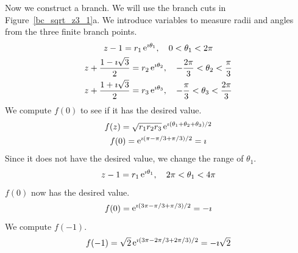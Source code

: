 {\begin{Solution}
  Now we construct a branch.  We will use the branch cuts in
  Figure~\ref{bc_sqrt_z3_1}a.  We introduce variables to measure radii and
  angles from the three finite branch points.
  \begin{gather*}
    z - 1 = r_1 \mathop{\mathrm{e}}\nolimits^{\imath \theta_1}, \quad 0 < \theta_1 < 2 \pi 
    \\
    z + \frac{1 - \imath \sqrt{3}}{2} = r_2 \mathop{\mathrm{e}}\nolimits^{\imath \theta_2}, 
    \quad -\frac{2 \pi}{3} < \theta_2 < \frac{\pi}{3} 
    \\
    z + \frac{1 + \imath \sqrt{3}}{2} = r_3 \mathop{\mathrm{e}}\nolimits^{\imath \theta_3},
    \quad -\frac{\pi}{3} < \theta_3 < \frac{2 \pi}{3}
  \end{gather*}
  We compute $f(0)$ to see if it has the desired value.
  \begin{gather*}
    f(z) = \sqrt{r_1 r_2 r_3} \mathop{\mathrm{e}}\nolimits^{\imath \left( \theta_1 + \theta_2 + \theta_3 \right) / 2} 
    \\
    f(0) = \mathop{\mathrm{e}}\nolimits^{\imath (\pi - \pi / 3 + \pi / 3) / 2} = \imath
  \end{gather*}
  Since it does not have the desired value, we change the range of $\theta_1$.
  \[
  z - 1 = r_1 \mathop{\mathrm{e}}\nolimits^{\imath \theta_1}, \quad 2 \pi < \theta_1 < 4 \pi
  \]
  $f(0)$ now has the desired value.
  \[
  f(0) = \mathop{\mathrm{e}}\nolimits^{\imath (3 \pi - \pi / 3 + \pi / 3) / 2} = - \imath
  \]
  We compute $f(-1)$.
  \[
  f(-1) = \sqrt{2} \mathop{\mathrm{e}}\nolimits^{\imath (3 \pi - 2 \pi / 3 + 2 \pi / 3) / 2} = - \imath \sqrt{2}
  \]
\end{Solution}
}






